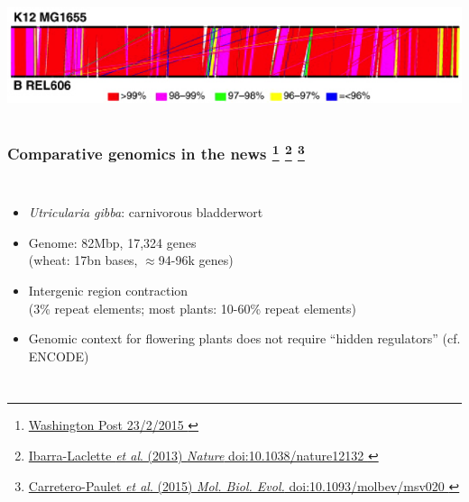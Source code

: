 \begin{frame}
\begin{columns}[c]
        \includegraphics[width=\textwidth]{images/ltee_linear}        
    \end{columns}  
\end{frame}

%
\begin{frame}
  \frametitle{Comparative genomics in the news
                   \footnote{\tiny{\href{http://www.washingtonpost.com/news/speaking-of-science/wp/2015/02/23/the-mysterious-genes-of-carnivorous-bladderwort-reveal-themselves/
}{Washington Post 23/2/2015
}}}
                   \footnote{\tiny{\href{http://dx.doi.org/10.1038/nature12132
}{Ibarra-Laclette \textit{et al}. (2013) \textit{Nature} doi:10.1038/nature12132
}}}
                   \footnote{\tiny{\href{http://dx.doi.org/10.1093/molbev/msv020
}{Carretero-Paulet \textit{et al}. (2015) \textit{Mol. Biol. Evol.} doi:10.1093/molbev/msv020
}}}
}
    \begin{columns}[c] 
        \begin{itemize}
          \item \textcolor{RawSienna}{\textit{Utricularia gibba}: carnivorous bladderwort}
          \item \textcolor{hutton_blue}{Genome: 82Mbp, 17,324 genes \\
          (wheat: 17bn bases, $\approx$94-96k genes)}
          \item Intergenic region contraction \\
          (3\% repeat elements; most plants: 10-60\% repeat elements)
          \item \textcolor{hutton_green}{Genomic context for flowering plants does not require ``hidden regulators'' (cf. ENCODE)}
        \end{itemize}

\end{columns}
\end{frame}
